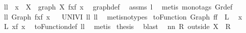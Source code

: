 \begin{isabellebody}
\ ll{}{}{\isacharcolon}\ \ {\isachardoublequoteopen}x\ {\isasymin}\ X{\isachardoublequoteclose}\ \ {\isachardoublequoteopen}graph\ X\ f{\isacharcomma}{\isacharcomma}x{\isacharequal}f\ x{\isachardoublequoteclose}\ \isanewline
%
\isadelimproof
%
\endisadelimproof
%
\isatagproof
{}\isamarkupfalse%
\ graph{\isacharunderscore}def\ \isamarkupfalse%
\ assms\ l{}{}\ \isamarkupfalse%
\ {\isacharparenleft}metis\ {\isacharparenleft}mono{\isacharunderscore}tags{\isacharparenright}\ Gr{\isacharunderscore}def{\isacharparenright}%
\endisatagproof
{\isafoldproof}%
%
\isadelimproof
\isanewline
%
\endisadelimproof
\isanewline
{}\isamarkupfalse%
\ ll{}{}{\isacharcolon}\ {\isachardoublequoteopen}Graph\ f{\isacharcomma}{\isacharcomma}x{\isacharequal}f\ x{\isachardoublequoteclose}%
\isadelimproof
\ %
\endisadelimproof
%
\isatagproof
{}\isamarkupfalse%
\ UNIV{\isacharunderscore}I\ ll{}{}\ ll{}{}\ \isamarkupfalse%
\ {\isacharparenleft}metis{\isacharparenleft}no{\isacharunderscore}types{\isacharparenright}{\isacharparenright}%
\endisatagproof
{\isafoldproof}%
%
\isadelimproof
%
\endisadelimproof
\isanewline
\isanewline
{}\isamarkupfalse%
\ {\isachardoublequoteopen}toFunction\ {\isacharparenleft}Graph\ f{\isacharparenright}{\isacharequal}f{\isachardoublequoteclose}\ {\isacharparenleft}\ {\isachardoublequoteopen}{\isacharquery}L{\isacharequal}{\isacharunderscore}{\isachardoublequoteclose}{\isacharparenright}\ \isanewline
%
\isadelimproof
%
\endisadelimproof
%
\isatagproof
{}\isamarkupfalse%
{\isacharminus}\isacommand{{\isacharbraceleft}}\isamarkupfalse%
\isamarkupfalse%
\ x\ \isamarkupfalse%
\ {\isachardoublequoteopen}{\isacharquery}L\ x{\isacharequal}f\ x{\isachardoublequoteclose}\ \isamarkupfalse%
\ toFunction{\isacharunderscore}def\ ll{}{}\ \isamarkupfalse%
\ metis\isacommand{{\isacharbraceright}}\isamarkupfalse%
\isamarkupfalse%
\ {\isacharquery}thesis\ \isamarkupfalse%
\ blast\ \isamarkupfalse%
%
\endisatagproof
{\isafoldproof}%
%
\isadelimproof
\isanewline
%
\endisadelimproof
\isanewline
{}\isamarkupfalse%
\ nn{}{}{\isacharcolon}\ {\isachardoublequoteopen}R\ outside\ X\ {\isasymsubseteq}\ R{\isachardoublequoteclose}%

\end{isabellebody}
